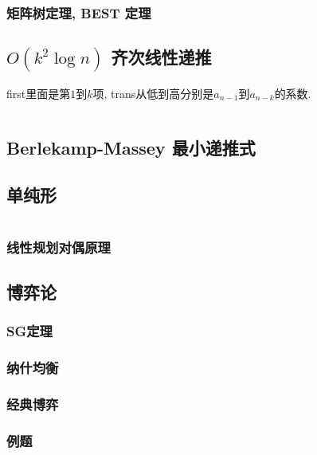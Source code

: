 \documentclass[a4paper, twoside]{article}
\begin{document}
\begin{multicols}{2}
				\subsubsection{矩阵树定理, BEST 定理}
					
			
			\subsection{$O(k^2 \log n)$ 齐次线性递推}
				first里面是第$1$到$k$项, trans从低到高分别是$a_{n - 1}$到$a_{n - k}$的系数.
				
				\inputminted{cpp}{../src/math/齐次线性递推.cpp}
			
			\subsection{Berlekamp-Massey 最小递推式}
				

			\subsection{单纯形}
				\inputminted{cpp}{../src/math/单纯形.cpp}

				\subsubsection{线性规划对偶原理}
					
			
			\subsection{博弈论}
				\subsubsection{SG定理}
					

				\subsubsection{纳什均衡}
					

				\subsubsection{经典博弈}
					\label{classicgame}
					

				\subsubsection{例题}
					


\end{multicols}
\end{document}
